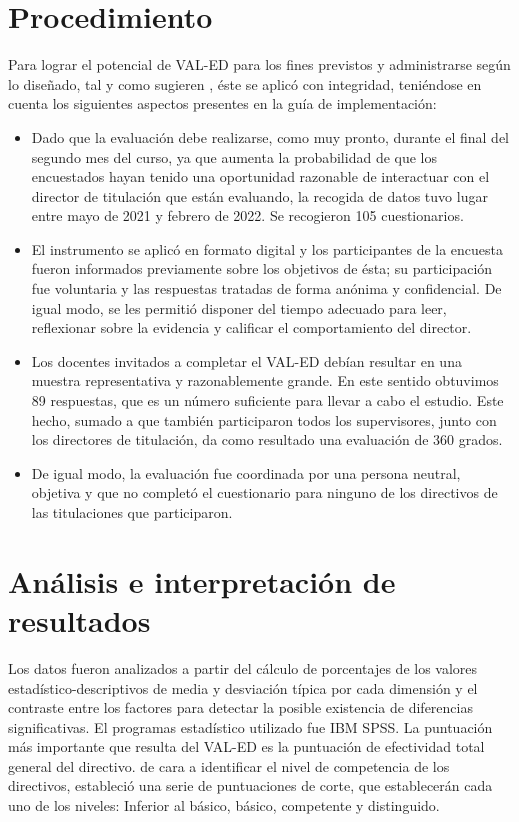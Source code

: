 \documentclass[spanish]{textolivre}
\begin{document}
\section{Procedimiento}
Para lograr el potencial de VAL-ED para los fines previstos y administrarse según lo diseñado, tal y como sugieren \textcite{vanderframework}, éste se aplicó con integridad, teniéndose en cuenta los siguientes aspectos presentes en la guía de implementación:

\begin{itemize}
 \item Dado que la evaluación debe realizarse, como muy pronto, durante el final del segundo mes del curso, ya que aumenta la probabilidad de que los encuestados hayan tenido una oportunidad razonable de interactuar con el director de titulación que están evaluando, la recogida de datos tuvo lugar entre mayo de 2021 y febrero de 2022. Se recogieron 105 cuestionarios. 
 \item El instrumento se aplicó en formato digital y los participantes de la encuesta fueron informados previamente sobre los objetivos de ésta; su participación fue voluntaria y las respuestas tratadas de forma anónima y confidencial. De igual modo, se les permitió disponer del tiempo adecuado para leer, reflexionar sobre la evidencia y calificar el comportamiento del director.
 \item Los docentes invitados a completar el VAL-ED debían resultar en una muestra representativa y razonablemente grande. En este sentido obtuvimos 89 respuestas, que es un número suficiente para llevar a cabo el estudio. Este hecho, sumado a que también participaron todos los supervisores, junto con los directores de titulación, da como resultado una evaluación de 360 grados.
 \item De igual modo, la evaluación fue coordinada por una persona neutral, objetiva y que no completó el cuestionario para ninguno de los directivos de las titulaciones que participaron.
\end{itemize}

\section{Análisis e interpretación de resultados}
Los datos fueron analizados a partir del cálculo de porcentajes de los valores estadístico-descriptivos de media y desviación típica por cada dimensión y el contraste entre los factores para detectar la posible existencia de diferencias significativas. El programas estadístico utilizado fue IBM SPSS. La puntuación más importante que resulta del VAL-ED es la puntuación de efectividad total general del directivo. \textcite{vanderhandbook} de cara a identificar el nivel de competencia de los directivos, estableció una serie de puntuaciones de corte, que establecerán cada uno de los niveles: Inferior al básico, básico, competente y distinguido.
\end{document}
